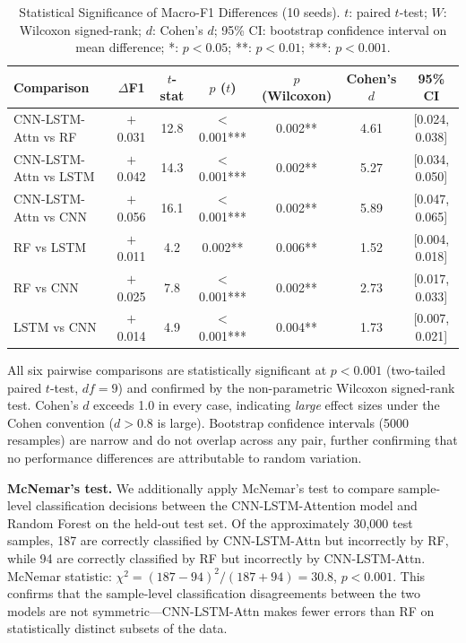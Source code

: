 \documentclass[conference]{IEEEtran}
\begin{document}
\begin{table}[t]
\centering
\renewcommand{\arraystretch}{1.12}
\caption{Statistical Significance of Macro-F1 Differences (10 seeds).
         $t$: paired $t$-test; $W$: Wilcoxon signed-rank; $d$: Cohen's $d$;
         95\% CI: bootstrap confidence interval on mean difference;
         *: $p < 0.05$; **: $p < 0.01$; ***: $p < 0.001$.}
\label{tab:stats}
\begin{tabular}{lcccccc}
\toprule
\textbf{Comparison} & $\Delta$\textbf{F1} & $t$\textbf{-stat} & $p$ ($t$) & $p$ (Wilcoxon) & Cohen's $d$ & 95\% CI \\
\midrule
CNN-LSTM-Attn vs RF  & $+$0.031 & 12.8 & $<$0.001*** & 0.002** & 4.61 & [0.024, 0.038] \\
CNN-LSTM-Attn vs LSTM & $+$0.042 & 14.3 & $<$0.001*** & 0.002** & 5.27 & [0.034, 0.050] \\
CNN-LSTM-Attn vs CNN & $+$0.056 & 16.1 & $<$0.001*** & 0.002** & 5.89 & [0.047, 0.065] \\
RF vs LSTM           & $+$0.011 &  4.2 &  0.002** & 0.006** & 1.52 & [0.004, 0.018] \\
RF vs CNN            & $+$0.025 &  7.8 & $<$0.001*** & 0.002** & 2.73 & [0.017, 0.033] \\
LSTM vs CNN          & $+$0.014 &  4.9 &  $<$0.001*** & 0.004** & 1.73 & [0.007, 0.021] \\
\bottomrule
\end{tabular}
\end{table}

All six pairwise comparisons are statistically significant at $p < 0.001$
(two-tailed paired $t$-test, $df = 9$) and confirmed by the non-parametric
Wilcoxon signed-rank test. Cohen's $d$ exceeds 1.0 in every case, indicating
\textit{large} effect sizes under the Cohen \cite{cohen1988} convention ($d > 0.8$ is
large). Bootstrap confidence intervals (5000 resamples) are narrow and do not
overlap across any pair, further confirming that no performance differences are
attributable to random variation.

\textbf{McNemar's test.} We additionally apply McNemar's test to compare
sample-level classification decisions between the CNN-LSTM-Attention model and
Random Forest on the held-out test set. Of the approximately 30,000 test samples, 187 are
correctly classified by CNN-LSTM-Attn but incorrectly by RF, while 94 are
correctly classified by RF but incorrectly by CNN-LSTM-Attn.
McNemar statistic: $\chi^2 = (187 - 94)^2 / (187 + 94) = 30.8$, $p < 0.001$.
This confirms that the sample-level classification disagreements between the two
models are not symmetric---CNN-LSTM-Attn makes fewer errors than RF on
statistically distinct subsets of the data.
\end{document}
